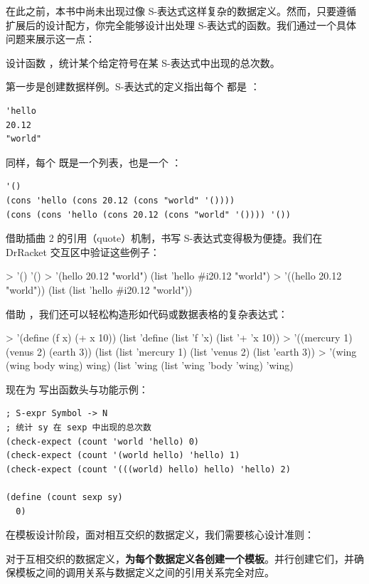 在此之前，本书中尚未出现过像 S-表达式这样复杂的数据定义。然而，只要遵循扩展后的设计配方，你完全能够设计出处理 S-表达式的函数。我们通过一个具体问题来展示这一点：

\begin{notebox}[样本问题]
设计函数 ，统计某个给定符号在某 S-表达式中出现的总次数。
\end{notebox}

第一步是创建数据样例。S-表达式的定义指出每个  都是 ：
\begin{lstlisting}[language=BSL]
'hello
20.12
"world"
\end{lstlisting}

同样，每个  既是一个列表，也是一个 ：
\begin{lstlisting}[language=BSL]
'()
(cons 'hello (cons 20.12 (cons "world" '())))
(cons (cons 'hello (cons 20.12 (cons "world" '()))) '())
\end{lstlisting}

借助插曲 2 的引用（quote）机制，书写 S-表达式变得极为便捷。我们在 DrRacket 交互区中验证这些例子：

\begin{replbox}
> '()
'()
> '(hello 20.12 "world")
(list 'hello #i20.12 "world")
> '((hello 20.12 "world"))
(list (list 'hello #i20.12 "world"))
\end{replbox}

借助 ，我们还可以轻松构造形如代码或数据表格的复杂表达式：

\begin{replbox}
> '(define (f x) (+ x 10))
(list 'define (list 'f 'x) (list '+ 'x 10))
> '((mercury 1) (venus 2) (earth 3))
(list (list 'mercury 1) (list 'venus 2) (list 'earth 3))
> '(wing (wing body wing) wing)
(list 'wing (list 'wing 'body 'wing) 'wing)
\end{replbox}

现在为  写出函数头与功能示例：

\begin{lstlisting}[language=BSL]
; S-expr Symbol -> N
; 统计 sy 在 sexp 中出现的总次数
(check-expect (count 'world 'hello) 0)
(check-expect (count '(world hello) 'hello) 1)
(check-expect (count '(((world) hello) hello) 'hello) 2)

(define (count sexp sy)
  0)
\end{lstlisting}

在模板设计阶段，面对相互交织的数据定义，我们需要核心设计准则：

\begin{notebox}[交织数据模板准则]
对于互相交织的数据定义，\textbf{为每个数据定义各创建一个模板}。并行创建它们，并确保模板之间的调用关系与数据定义之间的引用关系完全对应。
\end{notebox}


